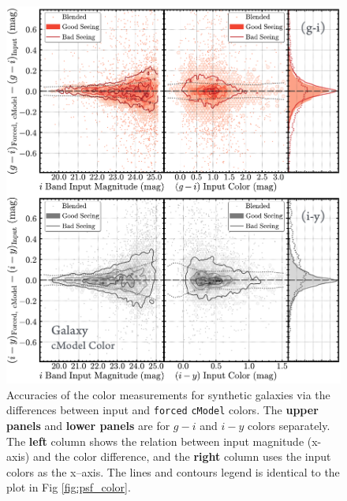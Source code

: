 \documentclass[useamsfonts]{pasj01}
\def\cmodel{\texttt{cModel}}
\def\forced{\texttt{forced}}
\begin{document}
\begin{figure}
    \begin{center}
        \includegraphics[width=\textwidth]{fig/synpipe_galaxy_color}
    \end{center}
    \caption{
        Accuracies of the color measurements for synthetic galaxies via the
        differences between input and \forced{} \cmodel{} colors.
        The \textbf{upper panels} and \textbf{lower panels} are for $g-i$ and $i-y$
        colors separately.
        The \textbf{left} column shows the relation between input magnitude (x-axis) and
        the color difference, and the \textbf{right} column uses the input colors as
       the  x--axis.
       The lines and contours legend is identical to the plot in Fig \ref{fig:psf_color}.
        }
    \label{fig:cmodel_color}
\end{figure}
\end{document}
